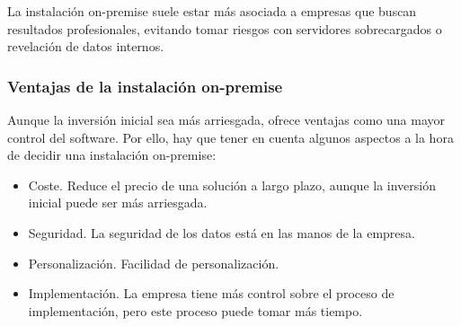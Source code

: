 La instalación on-premise suele estar más asociada a empresas que buscan resultados profesionales, evitando tomar riesgos con servidores sobrecargados o revelación de datos internos.

\subsubsection{Ventajas de la instalación on-premise}

Aunque la inversión inicial sea más arriesgada, ofrece ventajas como una mayor control del software. Por ello, hay que tener en cuenta algunos aspectos a la hora de decidir una instalación on-premise:

\begin{itemize}
  \item Coste. Reduce el precio de una solución a largo plazo, aunque la inversión inicial puede ser más arriesgada.
  \item Seguridad. La seguridad de los datos está en las manos de la empresa.
  \item Personalización. Facilidad de personalización.
  \item Implementación. La empresa tiene más control sobre el proceso de implementación, pero este proceso puede tomar más tiempo.
\end{itemize}
